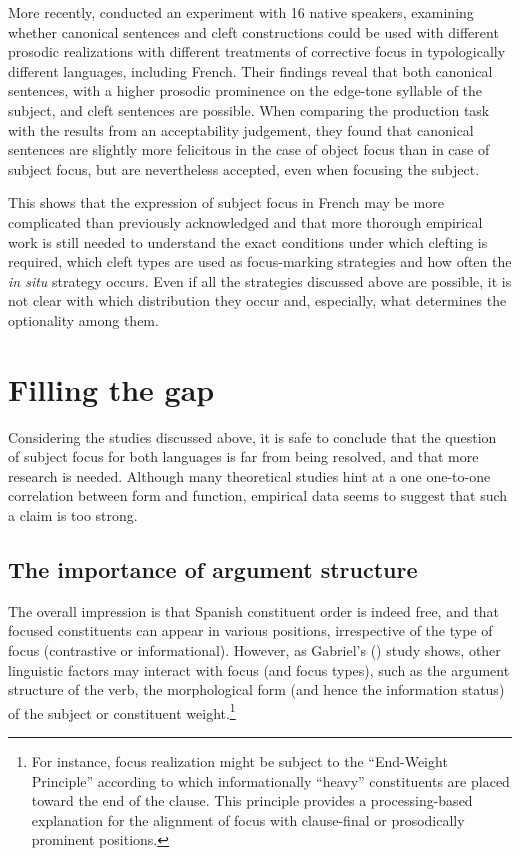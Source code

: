 More recently, \textcite{greif2021correction} conducted an experiment with 16 native speakers, examining whether canonical sentences and cleft constructions could be used with different prosodic realizations with different treatments of corrective focus in typologically different languages, including French. Their findings reveal that both canonical sentences, with a higher prosodic prominence on the edge-tone syllable of the subject, and cleft sentences are possible. When comparing the production task with the results from an acceptability judgement, they found that canonical sentences are slightly more felicitous in the case of object focus than in case of subject focus, but are nevertheless accepted, even when focusing the subject.

This shows that the expression of subject focus in French may be more complicated than previously acknowledged and that more thorough empirical work is still needed to understand the exact conditions under which clefting is required, which cleft types are used as focus-marking strategies and how often the \textit{in situ} strategy occurs. Even if all the strategies discussed above are possible, it is not clear with which distribution they occur and, especially, what determines the optionality among them.

\section{Filling the gap}
 
Considering the studies discussed above, it is safe to conclude that the question of subject focus for both languages is far from being resolved, and that more research is needed. Although many theoretical studies hint at a one one-to-one correlation between form and function, empirical data seems to suggest that such a claim is too strong. 

\subsection{The importance of argument structure}
The overall impression is that Spanish constituent order  is  indeed  free, and  that  focused  constituents  can  appear  in  various  positions, irrespective  of  the type  of  focus  (contrastive or  informational). However, as Gabriel’s (\citeyear{gabriel2007fokus}) study shows, other linguistic factors may interact with focus (and focus types), such as the argument structure of the verb, the morphological form (and hence the information status) of the subject or constituent weight.\footnote{For instance, focus realization might be subject to the ``End-Weight Principle” \parencite{quirk1985comprehensive,hawkins1994performance,hawkins2004efficiency} according to which informationally ``heavy” constituents are placed toward the end of the clause. This principle provides a processing-based explanation for the alignment of focus with clause-final or prosodically prominent positions.} 

